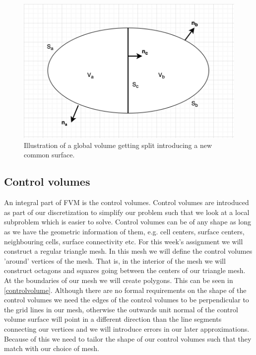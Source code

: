 \begin{figure}
	\centering
	\includegraphics[width=0.7\linewidth]{Materials/Conservation}
	\caption{Illustration of a global volume getting split introducing a new common surface.}
	\label{conservation}
\end{figure}

\subsection{Control volumes}
An integral part of FVM is the control volumes. Control volumes are introduced as part of our discretization to simplify our problem such that we look at a local subproblem which is easier to solve. Control volumes can be of any shape as long as we have the geometric information of them, e.g. cell centers, surface centers, neighbouring cells, surface connectivity etc. For this week's assignment we will construct a regular triangle mesh. In this mesh we will define the control volumes 'around' vertices of the mesh. That is, in the interior of the mesh we will construct octagons and squares going between the centers of our triangle mesh. At the boundaries of our mesh we will create polygons. This can be seen in \autoref{controlvolume}. Although there are no formal requirements on the shape of the control volumes we need the edges of the control volumes to be perpendicular to the grid lines in our mesh, otherwise the outwards unit normal of the control volume surface will point in a different direction than the line segments connecting our vertices and we will introduce errors in our later approximations. Because of this we need to tailor the shape of our control volumes such that they match with our choice of mesh.

